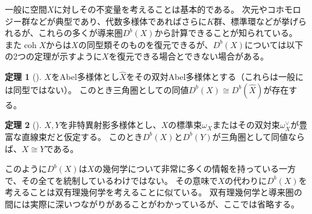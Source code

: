 \documentclass[uplatex,11pt,a4paper,dvipdfmx]{jsarticle}
\numberwithin{equation}{section}
\numberwithin{figure}{section}
\theoremstyle{definition}
\newtheorem{theorem}{定理}[section]
\DeclareMathOperator{\coh}{\mathrm{coh}}
\begin{document}
一般に空間$X$に対しその不変量を考えることは基本的である。
次元やコホモロジー群などが典型であり、代数多様体であればさらに$K$群、標準環などが挙げられるが、これらの多くが導来圏$D^b(X)$から計算できることが知られている。
また$\coh X$からは$X$の同型類そのものを復元できるが、$D^b(X)$については以下の2つの定理が示すように$X$を復元できる場合とできない場合がある。
\begin{theorem}[\cite{MR607081}]\label{thm:mukai}
    $X$をAbel多様体とし$\hat{X}$をその双対Abel多様体とする（これらは一般には同型ではない）。
    このとき三角圏としての同値$D^b(X) \cong D^b(\hat{X})$が存在する。
\end{theorem}
\begin{theorem}[\cite{MR1818984}]
    $X, Y$を非特異射影多様体とし、$X$の標準束$\omega_X$またはその双対束$\omega_X^\vee$が豊富な直線束だと仮定する。
    このとき$D^b(X)$と$D^b(Y)$が三角圏として同値ならば、$X\cong Y$である。
\end{theorem}
このように$D^b(X)$は$X$の幾何学について非常に多くの情報を持っている一方で、その全てを統制しているわけではない。
その意味で$X$の代わりに$D^b(X)$を考えることは双有理幾何学を考えることに似ている。
双有理幾何学と導来圏の間には実際に深いつながりがあることがわかっているが、ここでは省略する。
\end{document}
